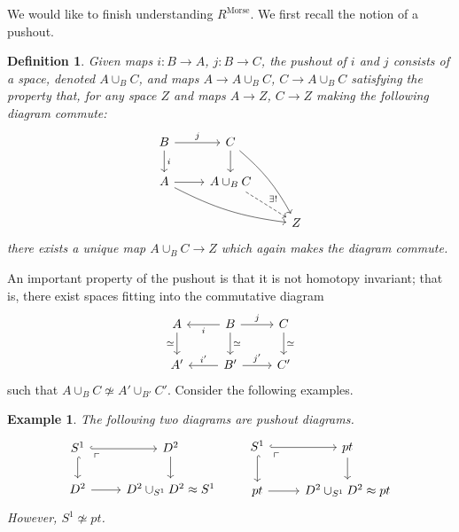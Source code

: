 \documentclass{article}
\newtheorem{definition}[theorem]{Definition}
\newtheorem{example}[theorem]{Example}
\newtheorem{proposed work}[theorem]{Proposed Work}
\DeclareMathOperator{\Morse}{Morse}
\begin{document}

We would like to finish understanding $R^{\Morse}$. We first recall the notion of a pushout.

\begin{definition}
Given maps $i: B \to A$, $j: B \to C$, the \emph{pushout} of $i$ and $j$ consists of a space, denoted $A \cup_B C$, and maps $A \to A\cup_B C$, $C \to A\cup_B C$ satisfying the property that, for any space $Z$ and maps $A \to Z$, $C \to Z$ making the following diagram commute:
\begin{equation*}
\begin{tikzcd}
B \arrow[r, "j"] \arrow[d,"i"] & C \arrow[d] \arrow[ddr, bend left=10] \\
A \arrow[r] \arrow[drr, bend right=10] & A \cup_B C \arrow[dashed, "\exists!", dr] \\
& & Z
\end{tikzcd}
\end{equation*}
there exists a unique map $A \cup_B C \to Z$ which again makes the diagram commute.
\end{definition}

An important property of the pushout is that it is not homotopy invariant; that is, there exist spaces fitting into the commutative diagram
\begin{equation*}
\begin{tikzcd}
A \arrow[d,swap, "\simeq"] & B \arrow[l, "i"] \arrow[r, "j"] \arrow[d, "\simeq"]& C \arrow[d, "\simeq"] \\
A' & B' \arrow[l,swap, "i'"] \arrow[r, "j'"] & C'
\end{tikzcd}
\end{equation*}
such that $A \cup_B C \not\simeq A' \cup_{B'} C'$. Consider the following examples.
\begin{example}
The following two diagrams are pushout diagrams.
\begin{equation*}
\begin{tikzcd}
S^1 \arrow[r,hook] \arrow[d,hook] \arrow[dr, phantom, "\ulcorner", very near start] & D^2 \arrow[d] \\
D^2 \arrow[r] & D^2 \cup_{S^1} D^2 \approx S^1
\end{tikzcd} \qquad
\begin{tikzcd}
S^1 \arrow[r,hook] \arrow[d,hook] \arrow[dr, phantom, "\ulcorner", very near start] & pt \arrow[d] \\
pt \arrow[r]& D^2 \cup_{S^1} D^2 \approx pt
\end{tikzcd}
\end{equation*}
However, $S^1 \not\simeq pt$. 
\end{example}
\end{document}
